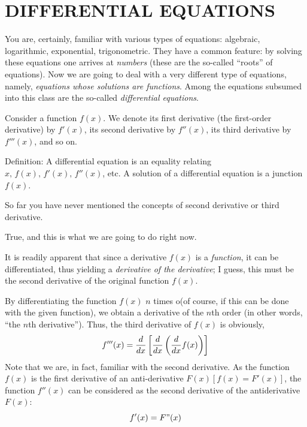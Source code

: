 

\chapter{DIFFERENTIAL EQUATIONS}
\label{diff-eqns}

\athr You are, certainly, familiar with various types of equations: algebraic, logarithmic, exponential, trigonometric. They have a common feature: by solving these equations one arrives at \emph{numbers} (these are the so-called ``roots'' of equations). Now we are going to deal with a very different type of equations, namely, \emph{equations whose solutions are functions}. Among the equations subsumed into this class are the so-called \emph{differential equations}.

Consider a function $f (x)$. We denote its first derivative (the first-order derivative) by $f' (x)$, its second derivative by $f''(x)$, its third derivative by $f''' (x)$, and so on.

\begin{mytheo}{Definition:}
A differential equation is an equality relating $x, \, f (x), \, f' (x), \, f'' (x)$, etc. A solution of a differential equation is a junction $f (x)$.
\end{mytheo}
\rdr So far you have never mentioned the concepts of second derivative or third derivative.

\athr True, and this is what we are going to do right now.

\rdr It is readily apparent that since a derivative $f (x)$ is a \emph{function}, it can be differentiated, thus yielding a \emph{derivative of the derivative}; I guess, this must be the second derivative of the original function $f (x)$.

\athr By differentiating the function $f (x)$ $n$ times o(of course, if this can be done with the given function), we obtain a derivative of the $n$th order (in other words, ``the $n$th derivative''). Thus, the third derivative of $f (x)$ is obviously,
\begin{equation*}%
f'''(x) = \ddx \left[ \ddx \left( \ddx f (x) \right) \right]
\end{equation*}
 Note that we are, in fact, familiar with the second derivative. As the function $f (x)$ is the first derivative of an anti-derivative $F (x) [f (x)= F' (x)]$, the function $f'' (x)$ can be considered as the second derivative of the antiderivative $F (x)$:
\begin{equation*}%
 f' (x) = F" (x)
\end{equation*}
 
